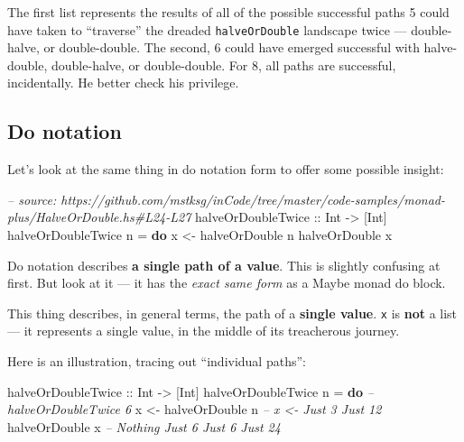 \documentclass[]{article}
\newenvironment{Shaded}{}{}
\newcommand{\KeywordTok}[1]{\textcolor[rgb]{0.00,0.44,0.13}{\textbf{#1}}}
\newcommand{\DataTypeTok}[1]{\textcolor[rgb]{0.56,0.13,0.00}{#1}}
\newcommand{\CommentTok}[1]{\textcolor[rgb]{0.38,0.63,0.69}{\textit{#1}}}
\newcommand{\OtherTok}[1]{\textcolor[rgb]{0.00,0.44,0.13}{#1}}
\newcommand{\FunctionTok}[1]{\textcolor[rgb]{0.02,0.16,0.49}{#1}}
\newcommand{\NormalTok}[1]{#1}
\begin{document}
The first list represents the results of all of the possible successful paths 5
could have taken to ``traverse'' the dreaded \texttt{halveOrDouble} landscape
twice --- double-halve, or double-double. The second, 6 could have emerged
successful with halve-double, double-halve, or double-double. For 8, all paths
are successful, incidentally. He better check his privilege.

\subsection{Do notation}\label{do-notation}

Let's look at the same thing in do notation form to offer some possible insight:

\begin{Shaded}
\begin{Highlighting}[]
\CommentTok{-- source: https://github.com/mstksg/inCode/tree/master/code-samples/monad-plus/HalveOrDouble.hs#L24-L27}
\OtherTok{halveOrDoubleTwice ::} \DataTypeTok{Int} \OtherTok{->}\NormalTok{ [}\DataTypeTok{Int}\NormalTok{]}
\NormalTok{halveOrDoubleTwice n }\FunctionTok{=} \KeywordTok{do}
\NormalTok{    x }\OtherTok{<-}\NormalTok{ halveOrDouble n}
\NormalTok{    halveOrDouble x}
\end{Highlighting}
\end{Shaded}

Do notation describes \textbf{a single path of a value}. This is slightly
confusing at first. But look at it --- it has the \emph{exact same form} as a
Maybe monad do block.

This thing describes, in general terms, the path of a \textbf{single value}.
\texttt{x} is \textbf{not} a list --- it represents a single value, in the
middle of its treacherous journey.

Here is an illustration, tracing out ``individual paths'':

\begin{Shaded}
\begin{Highlighting}[]
\OtherTok{halveOrDoubleTwice ::} \DataTypeTok{Int} \OtherTok{->}\NormalTok{ [}\DataTypeTok{Int}\NormalTok{]}
\NormalTok{halveOrDoubleTwice n }\FunctionTok{=} \KeywordTok{do}       \CommentTok{-- halveOrDoubleTwice 6}
\NormalTok{    x }\OtherTok{<-}\NormalTok{ halveOrDouble n        }\CommentTok{-- x <-     Just 3          Just 12}
\NormalTok{    halveOrDouble x             }\CommentTok{--      Nothing  Just 6  Just 6  Just 24}
\end{Highlighting}
\end{Shaded}
\end{document}
